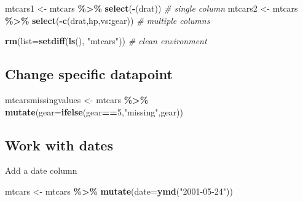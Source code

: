 \documentclass[
]{article}
\newenvironment{Shaded}{\begin{snugshade}}{\end{snugshade}}
\newcommand{\AttributeTok}[1]{\textcolor[rgb]{0.13,0.29,0.53}{#1}}
\newcommand{\CommentTok}[1]{\textcolor[rgb]{0.56,0.35,0.01}{\textit{#1}}}
\newcommand{\DecValTok}[1]{\textcolor[rgb]{0.00,0.00,0.81}{#1}}
\newcommand{\FunctionTok}[1]{\textcolor[rgb]{0.13,0.29,0.53}{\textbf{#1}}}
\newcommand{\NormalTok}[1]{#1}
\newcommand{\OtherTok}[1]{\textcolor[rgb]{0.56,0.35,0.01}{#1}}
\newcommand{\SpecialCharTok}[1]{\textcolor[rgb]{0.81,0.36,0.00}{\textbf{#1}}}
\newcommand{\StringTok}[1]{\textcolor[rgb]{0.31,0.60,0.02}{#1}}
\begin{document}
\begin{Shaded}
\begin{Highlighting}[]
\NormalTok{mtcars1 }\OtherTok{\textless{}{-}}\NormalTok{ mtcars }\SpecialCharTok{\%\textgreater{}\%} \FunctionTok{select}\NormalTok{(}\SpecialCharTok{{-}}\NormalTok{(drat)) }\CommentTok{\# single column}
\NormalTok{mtcars2 }\OtherTok{\textless{}{-}}\NormalTok{ mtcars }\SpecialCharTok{\%\textgreater{}\%} \FunctionTok{select}\NormalTok{(}\SpecialCharTok{{-}}\FunctionTok{c}\NormalTok{(drat,hp,vs}\SpecialCharTok{:}\NormalTok{gear)) }\CommentTok{\# multiple columns}

\FunctionTok{rm}\NormalTok{(}\AttributeTok{list=}\FunctionTok{setdiff}\NormalTok{(}\FunctionTok{ls}\NormalTok{(), }\StringTok{"mtcars"}\NormalTok{)) }\CommentTok{\# clean environment}
\end{Highlighting}
\end{Shaded}

\hypertarget{change-specific-datapoint}{%
\subsection{Change specific datapoint}\label{change-specific-datapoint}}

\begin{Shaded}
\begin{Highlighting}[]
\NormalTok{mtcarsmissingvalues }\OtherTok{\textless{}{-}}\NormalTok{ mtcars }\SpecialCharTok{\%\textgreater{}\%} \FunctionTok{mutate}\NormalTok{(}\AttributeTok{gear=}\FunctionTok{ifelse}\NormalTok{(gear}\SpecialCharTok{==}\DecValTok{5}\NormalTok{,}\StringTok{"missing"}\NormalTok{,gear))}
\end{Highlighting}
\end{Shaded}

\hypertarget{work-with-dates}{%
\subsection{Work with dates}\label{work-with-dates}}

Add a date column

\begin{Shaded}
\begin{Highlighting}[]
\NormalTok{mtcars }\OtherTok{\textless{}{-}}\NormalTok{ mtcars }\SpecialCharTok{\%\textgreater{}\%} \FunctionTok{mutate}\NormalTok{(}\AttributeTok{date=}\FunctionTok{ymd}\NormalTok{(}\StringTok{"2001{-}05{-}24"}\NormalTok{))}
\end{Highlighting}
\end{Shaded}
\end{document}

